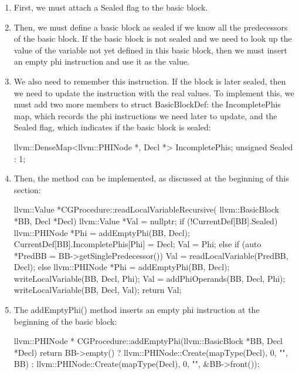 \begin{enumerate}
\item
First, we must attach a Sealed flag to the basic block.

\item
Then, we must define a basic block as sealed if we know all the predecessors of the basic block. If the basic block is not sealed and we need to look up the value of the variable not yet defined in this basic block, then we must insert an empty phi instruction and use it as the value.

\item
We also need to remember this instruction. If the block is later sealed, then we need to update the instruction with the real values. To implement this, we must add two more members to struct BasicBlockDef: the IncompletePhis map, which records the phi instructions we need later to update, and the Sealed flag, which indicates if the basic block is sealed:

\begin{cpp}
llvm::DenseMap<llvm::PHINode *, Decl *> IncompletePhis;
unsigned Sealed : 1;
\end{cpp}

\item
Then, the method can be implemented, as discussed at the beginning of this section:

\begin{cpp}
llvm::Value *CGProcedure::readLocalVariableRecursive(
        llvm::BasicBlock *BB, Decl *Decl) {
    llvm::Value *Val = nullptr;
    if (!CurrentDef[BB].Sealed) {
        llvm::PHINode *Phi = addEmptyPhi(BB, Decl);
        CurrentDef[BB].IncompletePhis[Phi] = Decl;
        Val = Phi;
    } else if (auto *PredBB = BB->getSinglePredecessor()) {
        Val = readLocalVariable(PredBB, Decl);
    } else {
        llvm::PHINode *Phi = addEmptyPhi(BB, Decl);
        writeLocalVariable(BB, Decl, Phi);
        Val = addPhiOperands(BB, Decl, Phi);
    }
    writeLocalVariable(BB, Decl, Val);
    return Val;
}
\end{cpp}

\item
The addEmptyPhi() method inserts an empty phi instruction at the beginning of the basic block:

\begin{cpp}
llvm::PHINode *
CGProcedure::addEmptyPhi(llvm::BasicBlock *BB,
        Decl *Decl) {
    return BB->empty()
        ? llvm::PHINode::Create(mapType(Decl), 0,
                                "", BB)
        : llvm::PHINode::Create(mapType(Decl), 0,
                                "", &BB->front());
}
\end{cpp}


\end{enumerate}

